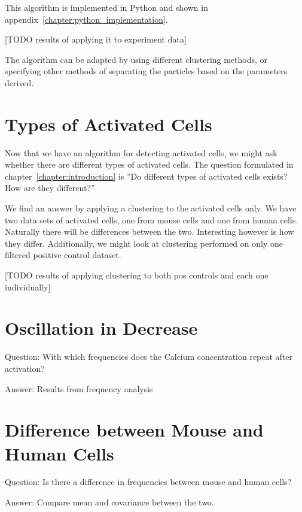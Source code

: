 This algorithm is implemented in Python and shown in appendix~\ref{chapter:python_implementation}.

[TODO results of applying it to experiment data]

The algorithm can be adapted by using different clustering methods, or specifying other methods of separating the particles based on the parameters derived.


\section{Types of Activated Cells}

Now that we have an algorithm for detecting activated cells, we might ask whether there are different types of activated cells. The question formulated in chapter~\ref{chapter:introduction} is ''Do different types of activated cells exists? How are they different?''

We find an answer by applying a clustering to the activated cells only. We have two data sets of activated cells, one from mouse cells and one from human cells. Naturally there will be differences between the two. Interesting however is how they differ. Additionally, we might look at clustering performed on only one filtered positive control dataset.

[TODO results of applying clustering to both pos controls and each one individually]

\section{Oscillation in Decrease}

Question: With which frequencies does the Calcium concentration repeat after activation?

Answer: Results from frequency analysis

\section{Difference between Mouse and Human Cells}

Question: Is there a difference in frequencies between mouse and human cells?

Answer: Compare mean and covariance between the two.